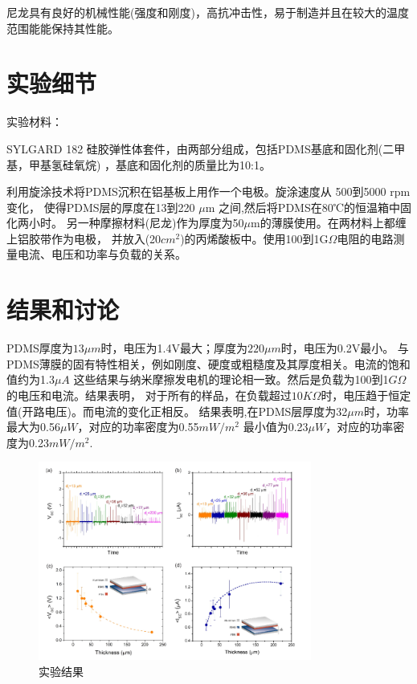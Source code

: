 \documentclass{ctexart}[UTF-8]        %
\begin{document}
尼龙具有良好的机械性能(强度和刚度)，高抗冲击性，易于制造并且在较大的温度范围能能保持其性能。

\section{实验细节}

实验材料：

SYLGARD 182 硅胶弹性体套件，由两部分组成，包括PDMS基底和固化剂(二甲基，甲基氢硅氧烷)
，基底和固化剂的质量比为10:1。

利用旋涂技术将PDMS沉积在铝基板上用作一个电极。旋涂速度从 500到5000 rpm变化，
使得PDMS层的厚度在13到220 $\mu$m 之间,然后将PDMS在80℃的恒温箱中固化两小时。
另一种摩擦材料(尼龙)作为厚度为50$\mu$m的薄膜使用。在两材料上都缠上铝胶带作为电极，
并放入(20$cm^2$)的丙烯酸板中。使用100到1G$\Omega$电阻的电路测量电流、电压和功率与负载的关系。


\section{结果和讨论}

PDMS厚度为$13\mu m$时，电压为1.4V最大；厚度为$220\mu m$时，电压为0.2V最小。
与PDMS薄膜的固有特性相关，例如刚度、硬度或粗糙度及其厚度相关。电流的饱和值约为1.3$\mu A$
这些结果与纳米摩擦发电机的理论相一致。然后是负载为100到1$G\Omega$的电压和电流。结果表明，
对于所有的样品，在负载超过$10K\Omega$时，电压趋于恒定值(开路电压)。而电流的变化正相反。
结果表明,在PDMS层厚度为32$\mu m$时，功率最大为0.56$\mu W$，对应的功率密度为0.55$mW/m^2$
最小值为0.23$\mu W$，对应的功率密度为0.23$mW/m^2$.


\begin{figure}[!ht]\centering
    \includegraphics[width=0.80\textwidth]{Image/V-I.png}
    \caption{实验结果}
\end{figure}
\end{document}

